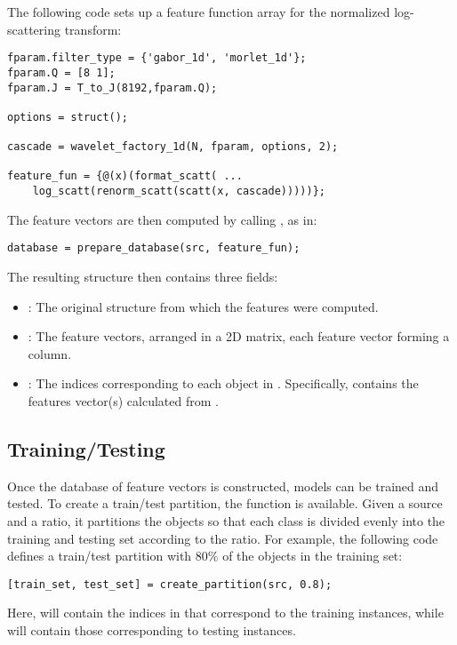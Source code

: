 \documentclass[twocolumn]{article}
\begin{document}
The following code sets up a feature function array for the normalized log-scattering transform:
\begin{lstlisting}
fparam.filter_type = {'gabor_1d', 'morlet_1d'};
fparam.Q = [8 1];
fparam.J = T_to_J(8192,fparam.Q);

options = struct();

cascade = wavelet_factory_1d(N, fparam, options, 2);

feature_fun = {@(x)(format_scatt( ...
	log_scatt(renorm_scatt(scatt(x, cascade)))))};
\end{lstlisting}

The feature vectors are then computed by calling , as in:
\begin{lstlisting}
database = prepare_database(src, feature_fun);
\end{lstlisting}
The resulting  structure then contains three fields:
\begin{itemize}
	\item {}: The original  structure from which the features were computed.
	\item {}: The feature vectors, arranged in a 2D matrix, each feature vector forming a column.
	\item {}: The indices corresponding to each object in . Specifically,  contains the features vector(s) calculated from .
\end{itemize}

\subsection{Training/Testing}

Once the database of feature vectors is constructed, models can be trained and tested. To create a train/test partition, the function  is available. Given a source  and a ratio, it partitions the objects so that each class is divided evenly into the training and testing set according to the ratio. For example, the following code defines a train/test partition with $80\%$ of the objects in the training set:
\begin{lstlisting}
[train_set, test_set] = create_partition(src, 0.8);
\end{lstlisting}
Here,  will contain the indices in  that correspond to the training instances, while  will contain those corresponding to testing instances.
\end{document}
